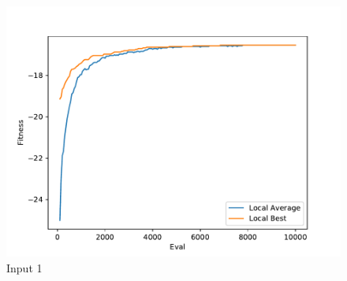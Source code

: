 \documentclass{standalone}
\begin{document}
\begin{figure}[!htb]
	\caption{Input 1}
	\label{fig:graph_1007}
	\includegraphics[width=\textwidth]{../graphs/graphs/1007.pdf}
\end{figure}
\end{document}
